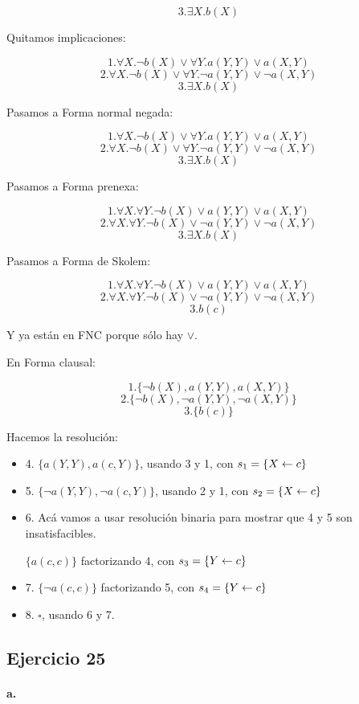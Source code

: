 \[3. \exists X. b(X)\]

Quitamos implicaciones:

\[1. \forall X. \lnot b(X) \lor \forall Y. a(Y,Y) \lor a(X,Y)\]
\[2. \forall X. \lnot b(X) \lor \forall Y. \lnot a(Y,Y) \lor \lnot a(X,Y)\]
\[3. \exists X. b(X)\]

Pasamos a Forma normal negada:

\[1. \forall X. \lnot b(X) \lor \forall Y. a(Y,Y) \lor a(X,Y)\]
\[2. \forall X. \lnot b(X) \lor \forall Y. \lnot a(Y,Y) \lor \lnot a(X,Y)\]
\[3. \exists X. b(X)\]

Pasamos a Forma prenexa:

\[1. \forall X. \forall Y. \lnot b(X) \lor a(Y,Y) \lor a(X,Y)\]
\[2. \forall X. \forall Y. \lnot b(X) \lor \lnot a(Y,Y) \lor \lnot a(X,Y)\]
\[3. \exists X. b(X)\]

Pasamos a Forma de Skolem:

\[1. \forall X. \forall Y. \lnot b(X) \lor a(Y,Y) \lor a(X,Y)\]
\[2. \forall X. \forall Y. \lnot b(X) \lor \lnot a(Y,Y) \lor \lnot a(X,Y)\]
\[3. b(c)\]

Y ya están en FNC porque sólo hay $\lor$.

En Forma clausal:

\[1. \{\lnot b(X), a(Y,Y), a(X,Y)\}\]
\[2. \{\lnot b(X), \lnot a(Y,Y), \lnot a(X,Y)\}\]
\[3. \{b(c)\}\]

Hacemos la resolución:

\begin{itemize}
  \item 4. $\{a(Y,Y), a(c,Y)\}$, usando 3 y 1, con $s_1=\{X \leftarrow c\}$
  \item 5. $\{\lnot a(Y,Y), \lnot a(c,Y)\}$, usando 2 y 1, con $s_2=\{X \leftarrow c\}$
  \item 6. Acá vamos a usar resolución binaria para mostrar que 4 y 5 son insatisfacibles.

  $\{a(c,c)\}$ factorizando 4, con $s_3=\{Y \leftarrow c\}$
  \item 7. $\{\lnot a(c,c)\}$ factorizando 5, con $s_4=\{Y \leftarrow c\}$
  \item 8. $\square$, usando 6 y 7.
\end{itemize}

\subsection*{Ejercicio 25}

\paragraph{a.}

